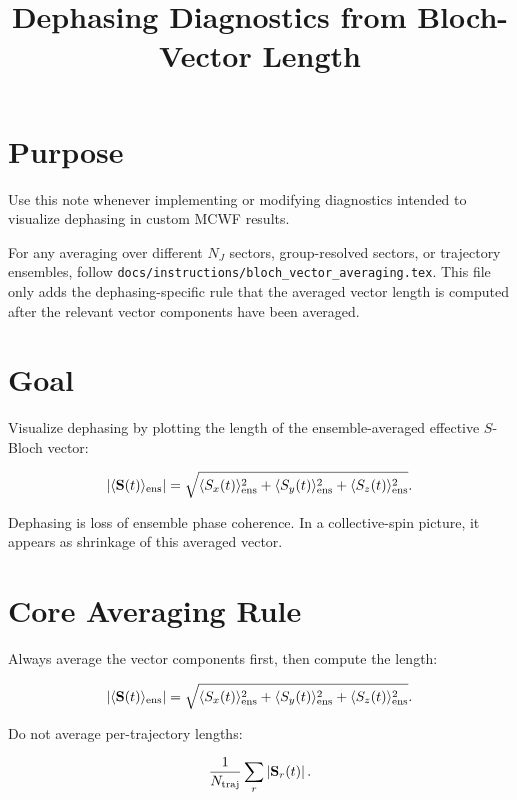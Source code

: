 \documentclass[11pt]{article}
\title{Dephasing Diagnostics from Bloch-Vector Length}
\author{}
\date{}
\begin{document}
\maketitle

\section*{Purpose}

Use this note whenever implementing or modifying diagnostics intended to visualize dephasing in custom MCWF results.

For any averaging over different \(N_J\) sectors, group-resolved sectors, or trajectory ensembles, follow \texttt{docs/instructions/bloch\_vector\_averaging.tex}. This file only adds the dephasing-specific rule that the averaged vector length is computed after the relevant vector components have been averaged.

\section*{Goal}

Visualize dephasing by plotting the length of the ensemble-averaged effective \(S\)-Bloch vector:

\begin{equation}
\left|\langle \mathbf S(t)\rangle_{\rm ens}\right|
=
\sqrt{
\langle S_x(t)\rangle_{\rm ens}^2+
\langle S_y(t)\rangle_{\rm ens}^2+
\langle S_z(t)\rangle_{\rm ens}^2
}.
\end{equation}

Dephasing is loss of ensemble phase coherence. In a collective-spin picture, it appears as shrinkage of this averaged vector.

\section*{Core Averaging Rule}

Always average the vector components first, then compute the length:

\begin{equation}
\left|\langle \mathbf S(t)\rangle_{\rm ens}\right|
=
\sqrt{
\langle S_x(t)\rangle_{\rm ens}^2+
\langle S_y(t)\rangle_{\rm ens}^2+
\langle S_z(t)\rangle_{\rm ens}^2
}.
\end{equation}

Do not average per-trajectory lengths:

\begin{equation}
\frac{1}{N_{\rm traj}}
\sum_r
\left|\mathbf S_r(t)\right|.
\end{equation}
\end{document}

